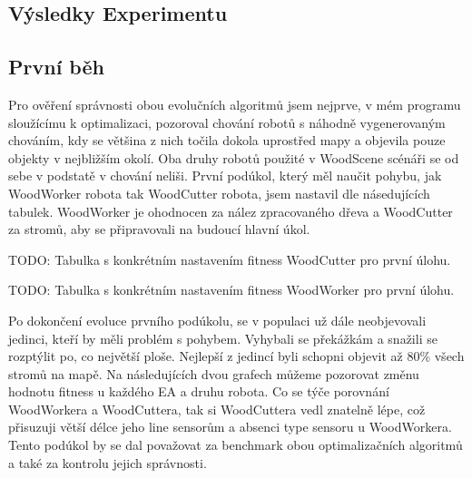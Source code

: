\subsection{Výsledky Experimentu}
\subsection{První běh}
Pro ověření správnosti obou evolučních algoritmů jsem nejprve, v mém programu sloužícímu k optimalizaci, pozoroval chování robotů s náhodně vygenerovaným chováním, kdy se většina z nich točila dokola uprostřed mapy a objevila pouze objekty v nejbližším okolí. Oba druhy robotů použité v WoodScene scénáři se od sebe v podstatě v chování neliši. První podúkol, který měl naučit pohybu, jak WoodWorker robota tak WoodCutter robota, jsem nastavil dle násedujících tabulek. WoodWorker je ohodnocen za nález zpracovaného dřeva a WoodCutter za stromů, aby se připravovali na budoucí hlavní úkol.\par
TODO: Tabulka s konkrétním nastavením fitness WoodCutter pro první úlohu. \par
TODO: Tabulka s konkrétním nastavením fitness WoodWorker pro první úlohu. \par
\par
Po dokončení evoluce prvního podúkolu, se v populaci už dále neobjevovali jedinci, kteří by měli problém s pohybem. Vyhybali se překážkám a snažili se rozptýlit po, co největší ploše. Nejlepší z jedincí byli schopni objevit až 80\% všech stromů na mapě. Na následujících dvou grafech můžeme pozorovat změnu hodnotu fitness u každého EA a druhu robota. Co se týče porovnání WoodWorkera a WoodCuttera, tak si WoodCuttera vedl znatelně lépe, což přisuzuji větší délce jeho line sensorům a absenci type sensoru u WoodWorkera. Tento podúkol by se dal považovat za benchmark obou optimalizačních algoritmů a také za kontrolu jejich správnosti. 

